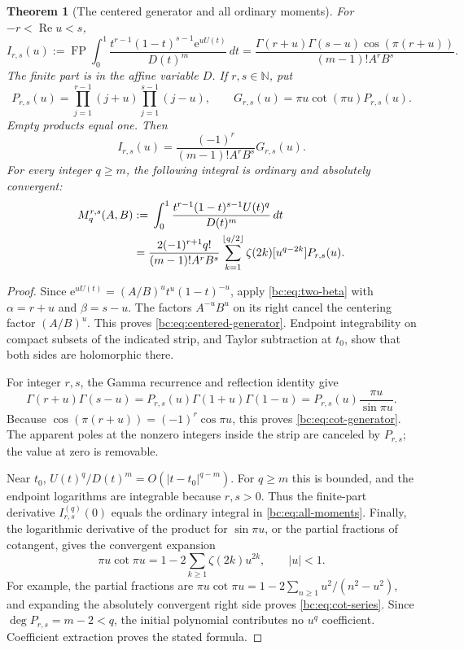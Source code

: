 \documentclass[11pt,letterpaper]{article}
\numberwithin{equation}{section}
\newtheorem{theorem}{Theorem}[section]
\theoremstyle{definition}
\theoremstyle{remark}
\newcommand{\bcFP}{\operatorname{FP}}
\newcommand{\bcRe}{\operatorname{Re}}
\newcommand{\bcN}{\mathbb N}
\newcommand{\bce}{\mathrm e}
\begin{document}
\begin{theorem}[The centered generator and all ordinary moments]
\label{bc:thm:moments}
For $-r<\bcRe u<s$,
\begin{equation}\label{bc:eq:centered-generator}
 I_{r,s}(u):=\bcFP\int_0^1
 \frac{t^{r-1}(1-t)^{s-1}\bce^{uU(t)}}{D(t)^m}\,dt
 =\frac{\Gamma(r+u)\Gamma(s-u)\cos(\pi(r+u))}
        {(m-1)!A^rB^s}.
\end{equation}
The finite part is in the affine variable $D$. If $r,s\in\bcN$, put
\begin{equation}\label{bc:eq:P}
 P_{r,s}(u)=\prod_{j=1}^{r-1}(j+u)
                \prod_{j=1}^{s-1}(j-u),\qquad
 G_{r,s}(u)=\pi u\cot(\pi u)P_{r,s}(u).
\end{equation}
Empty products equal one. Then
\begin{equation}\label{bc:eq:cot-generator}
 I_{r,s}(u)=\frac{(-1)^r}{(m-1)!A^rB^s}G_{r,s}(u).
\end{equation}
For every integer $q\ge m$, the following integral is ordinary and
absolutely convergent:
\begin{align}
 M_q^{r,s}(A,B)
 &:={}\int_0^1\frac{t^{r-1}(1-t)^{s-1}U(t)^q}{D(t)^m}\,dt\notag\\
 &=\frac{2(-1)^{r+1}q!}{(m-1)!A^rB^s}
       \sum_{k=1}^{\lfloor q/2\rfloor}
           \zeta(2k)[u^{q-2k}]P_{r,s}(u).
 \label{bc:eq:all-moments}
\end{align}
\end{theorem}
\begin{proof}
Since
$\bce^{uU(t)}=(A/B)^u t^u(1-t)^{-u}$, apply
\eqref{bc:eq:two-beta} with $\alpha=r+u$ and $\beta=s-u$.
The factors $A^{-u}B^u$ on its right cancel the centering factor
$(A/B)^u$. This proves \eqref{bc:eq:centered-generator}. Endpoint
integrability on compact subsets of the indicated strip, and Taylor
subtraction at $t_0$, show that both sides are holomorphic there.

For integer $r,s$, the Gamma recurrence and reflection identity give
\[
 \Gamma(r+u)\Gamma(s-u)
  =P_{r,s}(u)\Gamma(1+u)\Gamma(1-u)
  =P_{r,s}(u)\frac{\pi u}{\sin\pi u}.
\]
Because $\cos(\pi(r+u))=(-1)^r\cos\pi u$, this proves
\eqref{bc:eq:cot-generator}. The apparent poles at the nonzero integers
inside the strip are canceled by $P_{r,s}$; the value at zero is
removable.

Near $t_0$, $U(t)^q/D(t)^m=O(|t-t_0|^{q-m})$. For $q\ge m$ this is
bounded, and the endpoint logarithms are integrable because $r,s>0$.
Thus the finite-part derivative $I_{r,s}^{(q)}(0)$ equals the ordinary
integral in \eqref{bc:eq:all-moments}. Finally, the logarithmic derivative
of the product for $\sin\pi u$, or the partial fractions of cotangent,
gives the convergent expansion
\begin{equation}\label{bc:eq:cot-series}
 \pi u\cot\pi u=1-2\sum_{k\ge1}\zeta(2k)u^{2k},\qquad |u|<1.
\end{equation}
For example, the partial fractions are
$\pi u\cot\pi u=1-2\sum_{n\ge1}u^2/(n^2-u^2)$, and expanding the
absolutely convergent right side proves \eqref{bc:eq:cot-series}.
Since $\deg P_{r,s}=m-2<q$, the initial polynomial contributes no
$u^q$ coefficient. Coefficient extraction proves the stated formula.
\end{proof}
\end{document}
